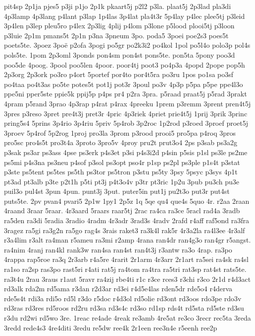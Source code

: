 {pit4sp
2p1ja
pjes5
p3ji
p1jo
2p1k
pkaart5j
p2l2
p3la.
plaat5j
2p3lad
pla3di
4p3lamp
4p3lang
p4lant
p3lap
1p4las
3p4lat
pla4t3r
5p4lay
p4lec
plee5tj
p3leid
3p4len
p3lep
pleu5ro
p4lex
2p3lig
4plij
p4lom
p3lone
p5lood
plooi5tj
p3loon
p3luie
2p1m
pmans5t
2p1n
p3na
3pneum
3po.
poda5
3poei
poe2s3
poes5t
poets5te.
3poez
3poë
p2ofa
3pogi
po5gr
po2k3i2
po4kol
1pol
po5l4o
polo3p
pol4s
pols5te.
1pom
2p3oml
3ponds
pon4sm
pon4st
pons5te.
pon5ta
5pony
poo3d
poo5de
4poog.
3pool
poo5len
4poor.
poor4tj
poot3
po4p3a
4popd
2pope
pop5h
2p3org
2p3ork
po3ro
p4ort
5portef
por4to
por4t5ra
po3ru
1pos
po1sa
po3sf
po4taa
po4t3as
po5te
potes5t
pot1j
pot3r
3poul
po3v
4p3p
p5pa
p5pe
ppe4l3o
ppe5ni
pper5ste
ppie5k
ppij5p
p4ps
pr4
p2ra
3pra.
p5raad
praat5j
p5rad
3prakt
4pram
p5rand
3prao
4p3rap
p4rat
p4rax
4preeku
1prem
p3remm
3prent
pren4t5j
3pres
p3reso
3pret
pre4t3j
pret3r
4pric
4p3riek
4priet
prie4t5j
1prij
3prik
3princ
pring5s4
5prins
3p4rio
3p4riu
5priv
5p4rob
3p2roc
1p2rod
p3roed
3proef
proet5j
3proev
5p4rof
5p2rog
1proj
pro3la
3prom
p3rood
prooi5
pro5pa
p4roq
3pros
pro5sc
pro4s5t
pro3t4a
3proto
3pro5v
4proy
pru2t
prut3o4
2ps
p3sab
ps3a2g
p3sak
ps3ar
ps3ass
4pse
ps3erk
p4s3et
p3si
p4s3i2d
p4sin
p5sis
p1sl
ps3le
ps2me
ps5mi
p4s3na
ps3neu
p4sof
p3sol
ps3opt
pso4r
p1sp
ps2pl
ps3ple
p1s4t
p3stat
p3ste
ps5tent
ps5tes
ps5th
ps3tor
ps5tron
p3stu
ps5ty
3psy
5psyc
p3sys
4p1t
pt3ad
pt3alb
p3te
p2t1h
p5ti
pt3j
p4t3o4v
p3tr
pt3ric
1p2u
3pub
pu3ch
pu3e
puil3o
pul4st
3pun
4pun.
punt3j
3put.
puter5in
put1j
pu2t3o
put3r
put4st
puts5te.
2pv
pvan4
pvari5
2p1w
1py1
2p5z
1q
5qe
qu4
que4s
5quo
4r.
r2aa
2raan
4raand
3raar
5raar.
4r3aard
5raars
raar5tj
2rac
ra4ca
ra3ce
5racl
rad4a
3radb
ra5den
ra3di
5radia
3radio
4radm
4r3adr
3rad3s
4radv
2rafd
r4aff
raf5ond
ra3fra
3ragez
ra5gi
ra3g2n
ra5go
rag4s
3rais
raket3
ra3k4l
rak5r
4r3a2la
ra4l3ee
4r3alf
r3a4lim
r3alt
ra4man
r5ameu
ra3mi
r2amp
4rana
ran4dr
ran4g3o
ran4gr
r5angst.
ra4nim
4ranj
ran4kl
rank3w
ran4sa
ran4st
ran4t3j
r3antw
ra3o
4rap.
ra3po
4rappa
rap5roe
ra3q
2r3arb
r4a5re
4rarit
2r1arm
4r3arr
2r1art
ra5sei
ra4sk
ra4sl
ra1so
ra2sp
ras3po
rast5ri
r4ati
rat5j
ra4tom
ra4tra
ra5tri
rat3sp
rat4st
rats5te.
ra3t4u
2rau
3raus
r1aut
5ravr
ra4zij
rbe4ti
r1c
r3ce
rces3
r3chi
r3co
2r1d
r4d3act
rd3alk
rda2m
rd5ama
r3dan
r2d3ar
rd3ei
r4d5e4las
rden5dr
rde5o4
r4derva
rde5s4t
rdi3a
rdi5o
rd5l
r3do
r5doc
r4d3ol
rd5olie
rd3ont
rd3oos
rdo3pe
rdo3v
rd3ras
rd3res
rd5roos
rd2ru
rd3sa
rd3s4c
rd3so
rd1sp
rds4t
rd5sta
rd5ste
rd3su
r3du
rd2wi
rd5wo
3re.
1reac
re4ade
4reak
re3amb
4re5at
re3co
3recr
rec5ta
3reda
3redd
rede4s3
4re4diti
3redu
re5dw
ree4k
2r1een
ree3n4e
r5eenh
ree2p
}

